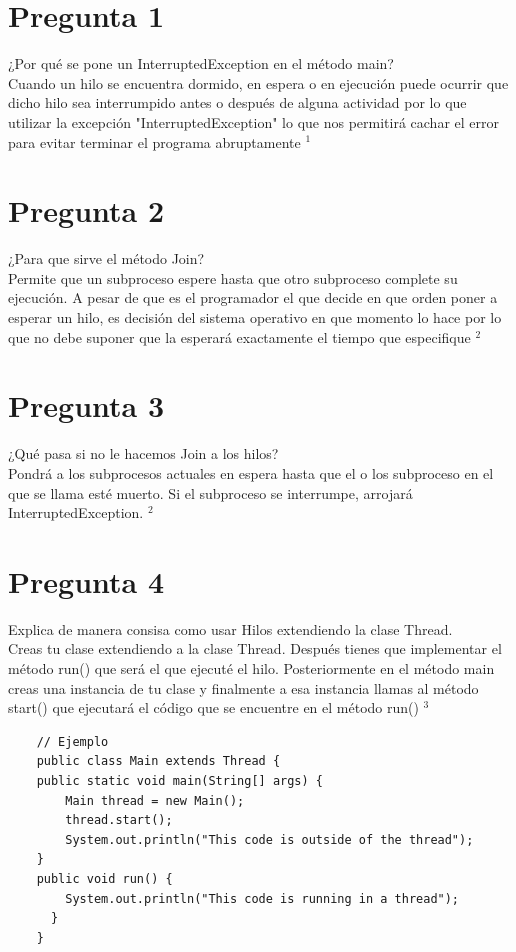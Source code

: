 \documentclass{article}
\begin{document}
	\newpage
	\section*{Pregunta 1}
    \Large 
    ¿Por qué se pone un InterruptedException en el método main?\\
    \normalsize
    Cuando un hilo se encuentra dormido, en espera o en ejecución puede ocurrir que dicho hilo sea interrumpido antes o después de alguna actividad por lo que utilizar la excepción "InterruptedException" lo que nos permitirá cachar el error para evitar terminar el programa abruptamente $^1$
    
    \section*{Pregunta 2}
    \Large 
    ¿Para que sirve el método Join?\\
    \normalsize
    Permite que un subproceso espere hasta que otro subproceso complete su ejecución. A pesar de que es el programador el que decide en que orden poner a esperar un hilo, es decisión del sistema operativo en que momento lo hace por lo que no debe suponer que la esperará exactamente el tiempo que especifique $^2$
    
    \section*{Pregunta 3}
    \Large 
    ¿Qué pasa si no le hacemos Join a los hilos?\\
    \normalsize
    Pondrá a los subprocesos actuales en espera hasta que el o los subproceso en el que se llama esté muerto. Si el subproceso se interrumpe, arrojará InterruptedException. $^2$
    
    \section*{Pregunta 4}
    \Large 
    Explica de manera consisa como usar Hilos extendiendo la clase Thread.\\
    \normalsize
    Creas tu clase extendiendo a la clase Thread. Después tienes que implementar el método run() que será el que ejecuté el hilo. Posteriormente en el método main creas una instancia de tu clase y finalmente a esa instancia llamas al método start() que ejecutará el código que se encuentre en el método run() $^3$
    \begin{lstlisting}
    // Ejemplo
    public class Main extends Thread {
    public static void main(String[] args) {
        Main thread = new Main();
        thread.start();
        System.out.println("This code is outside of the thread");
    }
    public void run() {
        System.out.println("This code is running in a thread");
      }
    }
    \end{lstlisting}
    
\end{document}
